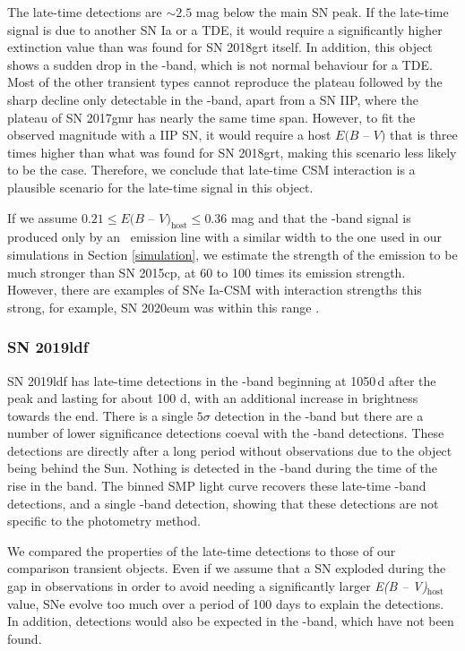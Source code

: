 \documentclass[a4paper,oneside,12pt, class=Latex/Classes/PhDthesisPSnPDF, crop=false]{standalone}
\begin{document}
The late-time detections are $\sim 2.5$ mag below the main SN peak. If the late-time signal is due to another SN Ia or a TDE, it would require a significantly higher extinction value than was found for SN 2018grt itself. In addition, this object shows a sudden drop in the \ztfr-band, which is not normal behaviour for a TDE. Most of the other transient types cannot reproduce the plateau followed by the sharp decline only detectable in the \ztfr-band, apart from a SN IIP, where the plateau of SN 2017gmr has nearly the same time span. However, to fit the observed magnitude with a IIP SN, it would require a host $ E(B$ -- $V)$ that is three times higher than what was found for SN 2018grt, making this scenario less likely to be the case. Therefore, we conclude that late-time CSM interaction is a plausible scenario for the late-time signal in this object.

If we assume $0.21 \leq E(B$ -- $V)_\text{host} \leq 0.36$ mag and that the \ztfr-band signal is produced only by an \Halpha~emission line with a similar width to the one used in our simulations in Section \ref{simulation}, we estimate the strength of the emission to be much stronger than SN 2015cp, at 60 to 100 times its emission strength. However, there are examples of SNe Ia-CSM with interaction strengths this strong, for example, SN 2020eum was within this range \citep{Ia-CSM_BTS}.


\subsubsection*{SN 2019ldf}
SN 2019ldf has late-time detections in the \ztfr-band beginning at 1050\,d after the peak and lasting for about 100 d, with an additional increase in brightness towards the end. There is a single $5\sigma$ detection in the \ztfi-band but there are a number of lower significance detections coeval with the \ztfr-band detections. These detections are directly after a long period without observations due to the object being behind the Sun. Nothing is detected in the \ztfg-band during the time of the rise in the \ztfr band. The binned SMP light curve recovers these late-time \ztfr-band detections, and a single \ztfi-band detection, showing that these detections are not specific to the photometry method.

We compared the properties of the late-time detections to those of our comparison transient objects. Even if we assume that a SN exploded during the gap in observations in order to avoid needing a significantly larger \textit{E(B -- V)}$_\text{host}$ value, SNe evolve too much over a period of 100 days to explain the detections. In addition, detections would also be expected in the \ztfg-band, which have not been found. 
\end{document}
